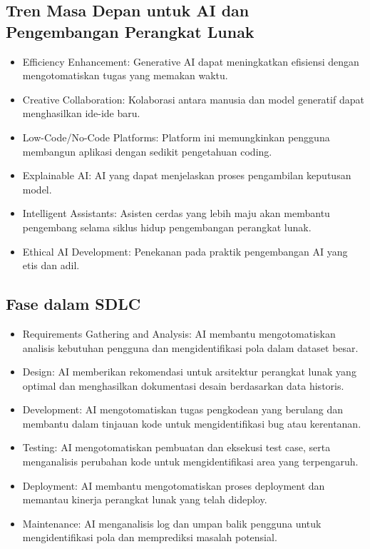 \documentclass{article}
\begin{document}
\subsection{Tren Masa Depan untuk AI dan Pengembangan Perangkat Lunak}
\begin{itemize}
    \item Efficiency Enhancement: Generative AI dapat meningkatkan efisiensi dengan mengotomatiskan tugas yang memakan waktu.
    \item Creative Collaboration: Kolaborasi antara manusia dan model generatif dapat menghasilkan ide-ide baru.
    \item Low-Code/No-Code Platforms: Platform ini memungkinkan pengguna membangun aplikasi dengan sedikit pengetahuan coding.
    \item Explainable AI: AI yang dapat menjelaskan proses pengambilan keputusan model.
    \item Intelligent Assistants: Asisten cerdas yang lebih maju akan membantu pengembang selama siklus hidup pengembangan perangkat lunak.
    \item Ethical AI Development: Penekanan pada praktik pengembangan AI yang etis dan adil.
\end{itemize}

\subsection{Fase dalam SDLC}
\begin{itemize}
    \item Requirements Gathering and Analysis: AI membantu mengotomatiskan analisis kebutuhan pengguna dan mengidentifikasi pola dalam dataset besar.
    \item Design: AI memberikan rekomendasi untuk arsitektur perangkat lunak yang optimal dan menghasilkan dokumentasi desain berdasarkan data historis.
    \item Development: AI mengotomatiskan tugas pengkodean yang berulang dan membantu dalam tinjauan kode untuk mengidentifikasi bug atau kerentanan.
    \item Testing: AI mengotomatiskan pembuatan dan eksekusi test case, serta menganalisis perubahan kode untuk mengidentifikasi area yang terpengaruh.
    \item Deployment: AI membantu mengotomatiskan proses deployment dan memantau kinerja perangkat lunak yang telah dideploy.
    \item Maintenance: AI menganalisis log dan umpan balik pengguna untuk mengidentifikasi pola dan memprediksi masalah potensial.
\end{itemize}
\end{document}
